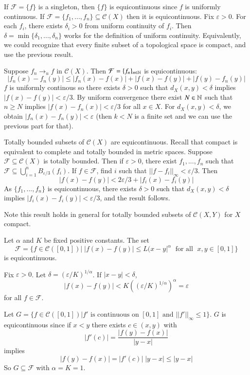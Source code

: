 \begin{example}
    If $\mathcal{F} = \{f\}$ is a singleton, then $\{f\}$ is equicontinuous since $f$ is uniformly continuous. If $\mathcal{F} = \{f_1,...,f_n\} \subseteq \mathcal{C}(X)$ then it is equicontinuous. Fix $\varepsilon > 0$. For each $f_i$, there exists $\delta_i > 0$ from uniform continuity of $f_i$. Then $\delta = \min\{\delta_1,...,\delta_n\}$ works for the definition of uniform continuity. Equivalently, we could recognize that every finite subset of a topological space is compact, and use the previous result.

    Suppose $f_n\rightarrow_uf$ in $\mathcal{C}(X)$. Then $\mathcal{F} = \{f_n\}_{n \in \mathbb N}$ is equicontinuous: $$|f_n(x) - f_n(y)| \leq |f_n(x) - f(x)| + |f(x)-f(y)| + |f(y) - f_n(y)|$$ $f$ is uniformly continous so there exists $\delta > 0$ such that $d_X(x,y) < \delta$ implies $|f(x)-f(y)| < \varepsilon/3$. By uniform convergence there exist $N \in \mathbb N$ such that $n \geq N$ implies $|f(x) - f_n(x)| < \varepsilon/3$ for all $x \in X$. For $d_X(x,y) < \delta$, we obtain $|f_n(x) - f_n(y)| < \varepsilon$ (then $k < N$ is a finite set and we can use the previous part for that).
\end{example}

\begin{example}
    Totally bounded subsets of $\mathcal{C}(X)$ are equicontinuous. Recall that compact is equivalent to complete and totally bounded in metric spaces. Suppose $\mathcal{F} \subseteq \mathcal{C}(X)$ is totally bounded. Then if $\varepsilon > 0$, there exist $f_1,...,f_n$ such that $\mathcal{F} \subseteq \bigcup_{i=1}^nB_{\varepsilon/3}(f_i)$. If $f \in \mathcal{F}$, find $i$ such that $||f-f_i||_{\infty} < \varepsilon/3$. Then $$|f(x)-f(y)| < 2\varepsilon/3 + |f_i(x) - f_i(y)|$$ As $\{f_1,...,f_n\}$ is equicontinuous, there exists $\delta > 0$ such that $d_X(x,y) < \delta$ implies $|f_i(x) - f_i(y)| <\varepsilon/3$, and the result follows.
\end{example}

Note this result holds in general for totally bounded subsets of $\mathcal{C}(X,Y)$ for $X$ compact.

\begin{example}
    Let $\alpha$ and $K$ be fixed positive constants. The set $$\mathcal{F} = \{f \in \mathcal{C}([0,1])\vert\;|f(x)-f(y)| \leq L(x-y|^{\alpha}\;\text{ for all }\;x,y \in [0,1]\}$$ is equicontinuous. 

    Fix $\varepsilon > 0$. Let $\delta = (\varepsilon/K)^{1/\alpha}$. If $|x-y| < \delta$, $$|f(x) - f(y)| < K((\varepsilon/K)^{1/\alpha})^{\alpha} = \varepsilon$$ for all $f \in \mathcal{F}$.

    Let $G = \{f \in \mathcal{C}([0,1])\vert f'\text{ is continuous on }[0,1] \text{ and } ||f'||_{\infty}\leq 1\}$. $G$ is equicontinuous since if $x < y$ there exists $c \in (x,y)$ with $$|f'(c)| = \frac{|f(y) - f(x)|}{|y-x|}$$ implies $$|f(y)-f(x)| = |f'(c)|\;|y-x| \leq |y-x|$$ So $G \subseteq \mathcal{F}$ with $\alpha = K = 1$.
\end{example}

